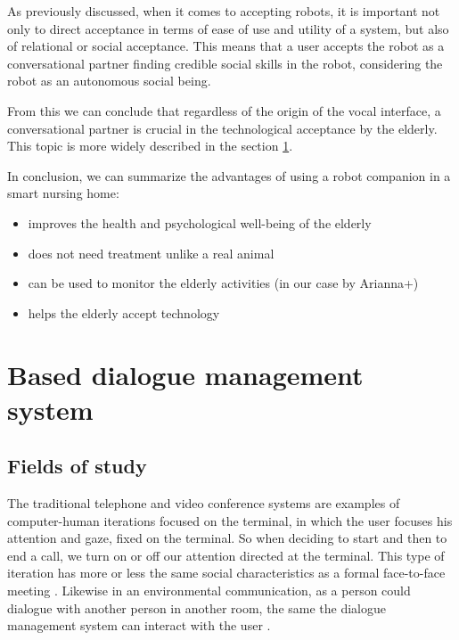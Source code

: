 \documentclass{thesisreport}
\begin{document}
 As previously discussed, when it comes to accepting robots, it is important not only to direct acceptance in terms of ease of use and utility of a system, but also of relational or social acceptance. This means that a user accepts the robot as a conversational partner finding credible social skills in the robot, considering the robot as an autonomous social being. 
 
 From this we can conclude that regardless of the origin of the vocal interface, a conversational partner is crucial in the technological acceptance by the elderly. This topic is more widely described in the section \ref{speech}.
 
 In conclusion, we can summarize the advantages of using a robot companion in a smart nursing home:
 \begin{itemize}
     \item improves the health and psychological well-being of the elderly
     \item does not need treatment unlike a real animal
     \item can be used to monitor the elderly activities (in our case by Arianna+)
     \item helps the elderly accept technology
 \end{itemize}

 \section{Based dialogue management system} \label{speech}
 \subsection{Fields of study}
 The traditional telephone and video conference systems are examples of computer-human iterations focused on the terminal, in which the user focuses his attention and gaze, fixed on the terminal. So when deciding to start and then to end a call, we turn on or off our attention directed at the terminal. This type of iteration has more or less the same social characteristics as a formal face-to-face meeting \cite{augusto2010ambient}.
 Likewise in an environmental communication, as a person could dialogue with another person in another room, the same the dialogue management system can interact with the  user .
 
\end{document}
